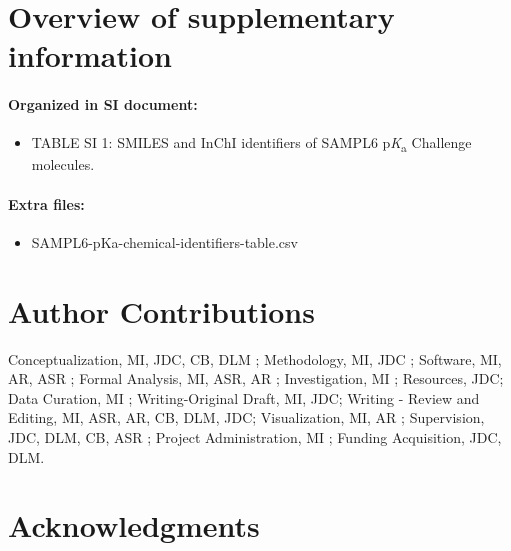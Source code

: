 \documentclass[9pt,lineno,final]{elife}
\newcommand{\pKa}{p\textit{K}\textsubscript{a}}
\begin{document}
\section{Overview of supplementary information}

\paragraph{Organized in SI document:}

\begin{itemize}
\item TABLE SI 1: SMILES and InChI identifiers of SAMPL6 \pKa{}  Challenge molecules.

\end{itemize}

\paragraph{Extra files:}  
\begin{itemize}
\item SAMPL6-pKa-chemical-identifiers-table.csv 
\end{itemize}


\section{Author Contributions}

Conceptualization, MI, JDC, CB, DLM ; Methodology, MI, JDC ; Software, MI, AR, ASR ; Formal Analysis, MI, ASR, AR ; Investigation, MI ; Resources, JDC;  Data Curation, MI ; Writing-Original Draft, MI, JDC; Writing - Review and Editing, MI, ASR, AR, CB, DLM, JDC; Visualization, MI, AR ; Supervision, JDC, DLM, CB, ASR ; Project Administration, MI ; Funding Acquisition, JDC, DLM.


\section{Acknowledgments}
\end{document}
